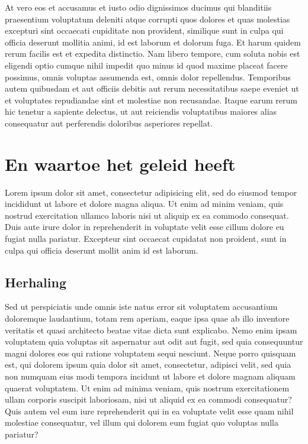 \documentclass[a4paper,11pt,oneside,openright,english,qr]{uacoursetext}
\begin{document}
At vero eos et accusamus et iusto odio dignissimos ducimus qui
blanditiis praesentium voluptatum deleniti atque corrupti quos dolores
et quas molestias excepturi sint occaecati cupiditate non provident,
similique sunt in culpa qui officia deserunt mollitia animi, id est
laborum et dolorum fuga. Et harum quidem rerum facilis est et expedita
distinctio. Nam libero tempore, cum soluta nobis est eligendi optio
cumque nihil impedit quo minus id quod maxime placeat facere possimus,
omnis voluptas assumenda est, omnis dolor repellendus. Temporibus
autem quibusdam et aut officiis debitis aut rerum necessitatibus saepe
eveniet ut et voluptates repudiandae sint et molestiae non
recusandae. Itaque earum rerum hic tenetur a sapiente delectus, ut aut
reiciendis voluptatibus maiores alias consequatur aut perferendis
doloribus asperiores repellat.

\section{En waartoe het geleid heeft}

Lorem ipsum dolor sit amet, consectetur adipisicing elit, sed do
eiusmod tempor incididunt ut labore et dolore magna aliqua. Ut enim ad
minim veniam, quis nostrud exercitation ullamco laboris nisi ut
aliquip ex ea commodo consequat. Duis aute irure dolor in
reprehenderit in voluptate velit esse cillum dolore eu fugiat nulla
pariatur. Excepteur sint occaecat cupidatat non proident, sunt in
culpa qui officia deserunt mollit anim id est laborum.

\subsection{Herhaling}
Sed ut perspiciatis unde omnis iste natus error sit voluptatem
accusantium doloremque laudantium, totam rem aperiam, eaque ipsa quae
ab illo inventore veritatis et quasi architecto beatae vitae dicta
sunt explicabo. Nemo enim ipsam voluptatem quia voluptas sit
aspernatur aut odit aut fugit, sed quia consequuntur magni dolores eos
qui ratione voluptatem sequi nesciunt. Neque porro quisquam est, qui
dolorem ipsum quia dolor sit amet, consectetur, adipisci velit, sed
quia non numquam eius modi tempora incidunt ut labore et dolore magnam
aliquam quaerat voluptatem. Ut enim ad minima veniam, quis nostrum
exercitationem ullam corporis suscipit laboriosam, nisi ut aliquid ex
ea commodi consequatur? Quis autem vel eum iure reprehenderit qui in
ea voluptate velit esse quam nihil molestiae consequatur, vel illum
qui dolorem eum fugiat quo voluptas nulla pariatur?
\end{document}
